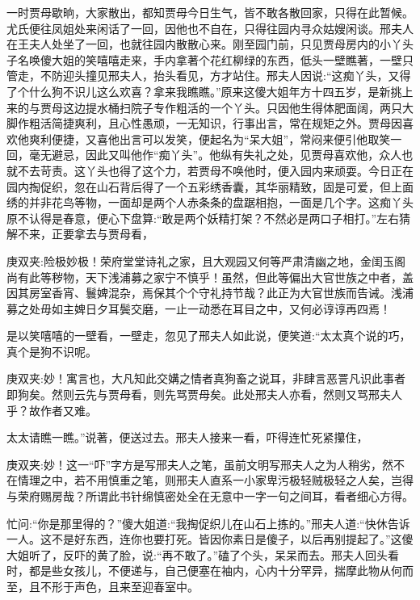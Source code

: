 \begin{parag}
    一时贾母歇晌，大家散出，都知贾母今日生气，皆不敢各散回家，只得在此暂候。尤氏便往凤姐处来闲话了一回，因他也不自在，只得往园内寻众姑嫂闲谈。邢夫人在王夫人处坐了一回，也就往园内散散心来。刚至园门前，只见贾母房内的小丫头子名唤傻大姐的笑嘻嘻走来，手内拿著个花红柳绿的东西，低头一壁瞧著，一壁只管走，不防迎头撞见邢夫人，抬头看见，方才站住。邢夫人因说:“这痴丫头，又得了个什么狗不识儿这么欢喜？拿来我瞧瞧。”原来这傻大姐年方十四五岁，是新挑上来的与贾母这边提水桶扫院子专作粗活的一个丫头。只因他生得体肥面阔，两只大脚作粗活简捷爽利，且心性愚顽，一无知识，行事出言，常在规矩之外。贾母因喜欢他爽利便捷，又喜他出言可以发笑，便起名为“呆大姐”，常闷来便引他取笑一回，毫无避忌，因此又叫他作“痴丫头”。他纵有失礼之处，见贾母喜欢他，众人也就不去苛责。这丫头也得了这个力，若贾母不唤他时，便入园内来顽耍。今日正在园内掏促织，忽在山石背后得了一个五彩绣香囊，其华丽精致，固是可爱，但上面绣的并非花鸟等物，一面却是两个人赤条条的盘踞相抱，一面是几个字。这痴丫头原不认得是春意，便心下盘算:“敢是两个妖精打架？不然必是两口子相打。”左右猜解不来，正要拿去与贾母看，\begin{note}庚双夹:险极妙极！荣府堂堂诗礼之家，且大观园又何等严肃清幽之地，金闺玉阁尚有此等秽物，天下浅浦募之家宁不慎乎！虽然，但此等偏出大官世族之中者，盖因其房室香宵、鬟婢混杂，焉保其个个守礼持节哉？此正为大官世族而告诫。浅浦募之处毋如主婢日夕耳鬓交磨，一止一动悉在耳目之中，又何必谆谆再四焉！\end{note}是以笑嘻嘻的一壁看，一壁走，忽见了邢夫人如此说，便笑道:“太太真个说的巧，真个是狗不识呢。\begin{note}庚双夹:妙！寓言也，大凡知此交媾之情者真狗畜之说耳，非肆言恶詈凡识此事者即狗矣。然则云先与贾母看，则先骂贾母矣。此处邢夫人亦看，然则又骂邢夫人乎？故作者又难。\end{note}太太请瞧一瞧。”说著，便送过去。邢夫人接来一看，吓得连忙死紧攥住，\begin{note}庚双夹:妙！这一“吓”字方是写邢夫人之笔，虽前文明写邢夫人之为人稍劣，然不在情理之中，若不用慎重之笔，则邢夫人直系一小家卑污极轻贼极轻之人矣，岂得与荣府赐房哉？所谓此书针绵慎密处全在无意中一字一句之间耳，看者细心方得。\end{note}忙问:“你是那里得的？”傻大姐道:“我掏促织儿在山石上拣的。”邢夫人道:“快休告诉一人。这不是好东西，连你也要打死。皆因你素日是傻子，以后再别提起了。”这傻大姐听了，反吓的黄了脸，说:“再不敢了。”磕了个头，呆呆而去。邢夫人回头看时，都是些女孩儿，不便递与，自己便塞在袖内，心内十分罕异，揣摩此物从何而至，且不形于声色，且来至迎春室中。
\end{parag}


